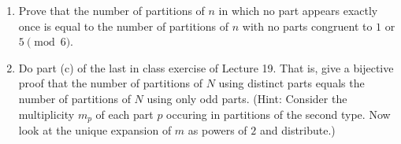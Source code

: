 \documentclass{report}
\begin{document}
{\begin{enumerate}
    \item Prove that the number of partitions of $n$ in which no part appears
          exactly once is equal to the number of partitions of $n$ with no
          parts congruent to $1$ or $5 \pmod{6}$.

    \item Do part (c) of the last in class exercise of Lecture 19.
          That is, give a bijective proof that the number of partitions
          of $N$ using distinct parts equals the number of partitions of
          $N$ using only odd parts. (Hint: Consider the multiplicity $m_p$
          of each part $p$ occuring in partitions of the second type.
          Now look at the unique expansion of $m$ as powers of $2$ and
          distribute.)

\end{enumerate}}
\end{document}
